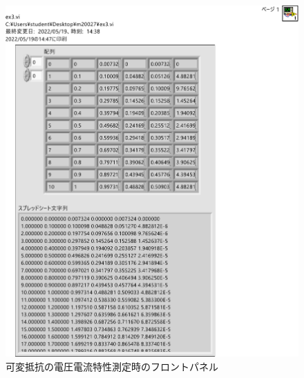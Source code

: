 \begin{figure}[h]
\centering
\includegraphics[scale=0.5]{./fig/ex32-flont.pdf}
\caption{可変抵抗の電圧電流特性測定時のフロントパネル}
\label{fig:ex32-flont}
\end{figure}

